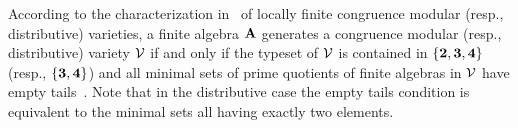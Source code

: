 
According to the characterization
in~\cite[Ch.~8]{HM:1988} of locally finite congruence modular (resp.,
distributive) varieties, a finite algebra $\mathbf{A}$ generates a congruence modular
(resp., distributive) variety $\mathcal{V}$ if and only if the typeset 
of $\mathcal{V}$ is
contained in $\{\textbf{2}, \textbf{3}, \textbf{4}\}$ (resp., $\{\textbf{3}, \textbf{4}\}$) 
and all minimal sets of prime
quotients of finite algebras in $\mathcal{V}$ have empty
tails~\cite[Def.~2.15]{HM:1988}. Note that in the distributive 
case the empty tails condition is equivalent to the minimal sets all having exactly
two elements.


